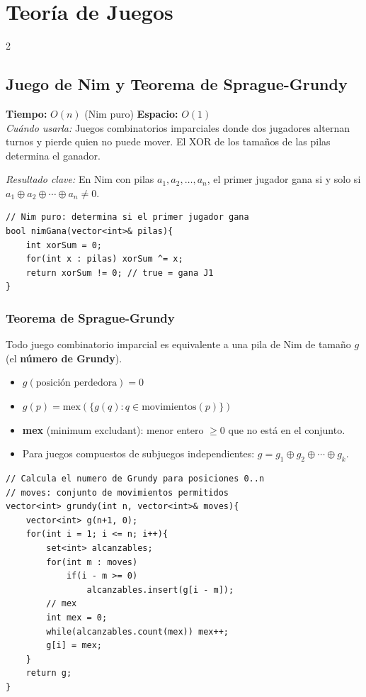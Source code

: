 \documentclass[10pt,a4paper]{article}
\begin{document}
\section{Teor\'ia de Juegos}
\begin{multicols}{2}

\subsection{Juego de Nim y Teorema de Sprague-Grundy}
\textbf{Tiempo:} $O(n)$ (Nim puro) \quad \textbf{Espacio:} $O(1)$\\
\textit{Cu\'ando usarla:} Juegos combinatorios imparciales donde dos jugadores alternan turnos y pierde quien no puede mover. El XOR de los tama\~nos de las pilas determina el ganador.

\textit{Resultado clave:} En Nim con pilas $a_1, a_2, \ldots, a_n$, el primer jugador gana si y solo si $a_1 \oplus a_2 \oplus \cdots \oplus a_n \neq 0$.

\begin{lstlisting}
// Nim puro: determina si el primer jugador gana
bool nimGana(vector<int>& pilas){
    int xorSum = 0;
    for(int x : pilas) xorSum ^= x;
    return xorSum != 0; // true = gana J1
}
\end{lstlisting}

\subsubsection{Teorema de Sprague-Grundy}
Todo juego combinatorio imparcial es equivalente a una pila de Nim de tama\~no $g$ (el \textbf{n\'umero de Grundy}).

\begin{itemize}
  \item $g(\text{posici\'on perdedora}) = 0$
  \item $g(p) = \text{mex}(\{g(q) : q \in \text{movimientos}(p)\})$
  \item \textbf{mex} (minimum excludant): menor entero $\geq 0$ que no est\'a en el conjunto.
  \item Para juegos compuestos de subjuegos independientes: $g = g_1 \oplus g_2 \oplus \cdots \oplus g_k$.
\end{itemize}

\begin{lstlisting}
// Calcula el numero de Grundy para posiciones 0..n
// moves: conjunto de movimientos permitidos
vector<int> grundy(int n, vector<int>& moves){
    vector<int> g(n+1, 0);
    for(int i = 1; i <= n; i++){
        set<int> alcanzables;
        for(int m : moves)
            if(i - m >= 0)
                alcanzables.insert(g[i - m]);
        // mex
        int mex = 0;
        while(alcanzables.count(mex)) mex++;
        g[i] = mex;
    }
    return g;
}
\end{lstlisting}


\end{multicols}
\end{document}
